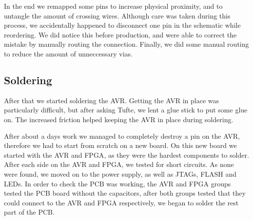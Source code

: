 In the end we remapped some pins to increase physical proximity, and to untangle the amount of crossing wires. Although care was taken during this process, we accidentally happened to disconnect one pin in the schematic while reordering. We did notice this before production, and were able to correct the mistake by manually routing the connection. Finally, we did some manual routing to reduce the amount of unneccessary vias.

\subsection{Soldering}
After that we started soldering the AVR. Getting the AVR in place was particularly difficult,
but after asking Tufte, we lent a glue stick to put some glue on. The increased friction helped keeping the AVR in place during soldering.

After about a days work we managed to completely destroy a pin on the AVR,
therefore we had to start from scratch on a new board. On this new board we
started with the AVR and \ac{FPGA}, as they were the hardest components to
solder. After each side on the AVR and \ac{FPGA}, we tested for short
circuits. As none were found, we moved on to the power supply, as well as
\acp{JTAG}, FLASH and \acp{LED}. In order to check the \ac{PCB} was working, the
AVR and \ac{FPGA} groups tested the \ac{PCB} board without the capacitors, after
both groups tested that they could connect to the AVR and \ac{FPGA}
respectively, we began to solder the rest part of the \ac{PCB}.

